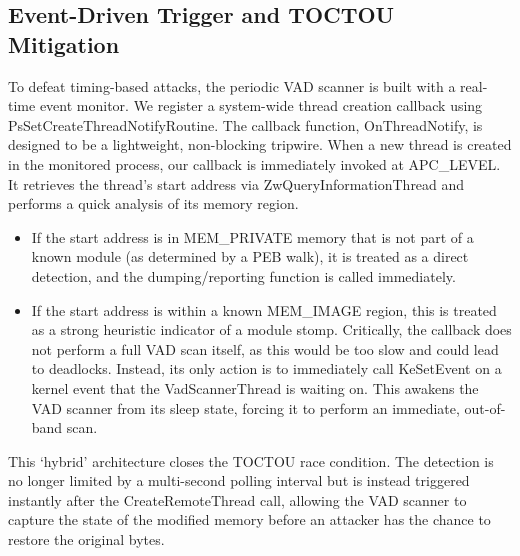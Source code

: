 \documentclass[journal]{IEEEtran}
\begin{document}
\subsection{Event-Driven Trigger and TOCTOU Mitigation}
To defeat timing-based attacks, the periodic VAD scanner is built with a real-time event monitor. We register a system-wide thread creation callback using PsSetCreateThreadNotifyRoutine. The callback function, OnThreadNotify, is designed to be a lightweight, non-blocking tripwire.
When a new thread is created in the monitored process, our callback is immediately invoked at APC\_LEVEL. It retrieves the thread's start address via ZwQueryInformationThread and performs a quick analysis of its memory region.
\begin{itemize}
\item If the start address is in MEM\_PRIVATE memory that is not part of a known module (as determined by a PEB walk), it is treated as a direct detection, and the dumping/reporting function is called immediately.
\item If the start address is within a known MEM\_IMAGE region, this is treated as a strong heuristic indicator of a module stomp. Critically, the callback does not perform a full VAD scan itself, as this would be too slow and could lead to deadlocks. Instead, its only action is to immediately call KeSetEvent on a kernel event that the VadScannerThread is waiting on. This awakens the VAD scanner from its sleep state, forcing it to perform an immediate, out-of-band scan.
\end{itemize}
This `hybrid' architecture closes the TOCTOU race condition. The detection is no longer limited by a multi-second polling interval but is instead triggered instantly after the CreateRemoteThread call, allowing the VAD scanner to capture the state of the modified memory before an attacker has the chance to restore the original bytes.
\end{document}
